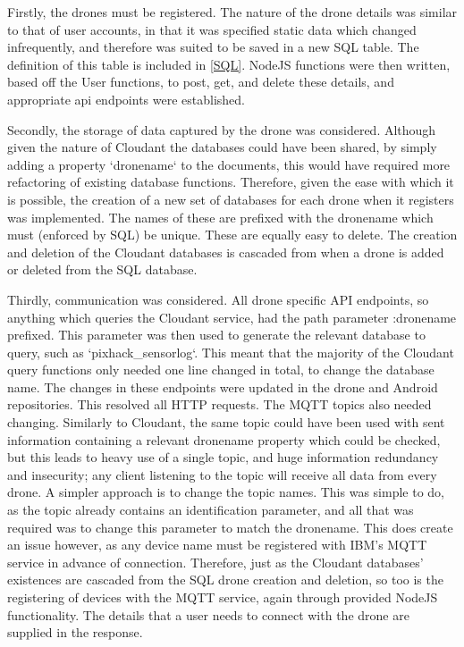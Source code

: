 \documentclass{article}
\begin{document}
Firstly, the drones must be registered. The nature of the drone details was similar to that of user accounts, in that it was specified static data which changed infrequently, and therefore was suited to be saved in a new SQL table. The definition of this table is included in \ref{SQL}. NodeJS functions were then written, based off the User functions, to post, get, and delete these details, and appropriate api endpoints were established. 

Secondly, the storage of data captured by the drone was considered. Although given the nature of Cloudant the databases could have been shared, by simply adding a property `dronename` to the documents, this would have required more refactoring of existing database functions. Therefore, given the ease with which it is possible, the creation of a new set of databases for each drone when it registers was implemented. The names of these are prefixed with the dronename which must (enforced by SQL) be unique. These are equally easy to delete. The creation and deletion of the Cloudant databases is cascaded from when a drone is added or deleted from the SQL database. 

Thirdly, communication was considered. All drone specific API endpoints, so anything which queries the Cloudant service, had the path parameter :dronename prefixed. This parameter was then used to generate the relevant database to query, such as `pixhack\_sensorlog`. This meant that the majority of the Cloudant query functions only needed one line changed in total, to change the database name. The changes in these endpoints were updated in the drone and Android repositories. This resolved all HTTP requests. The MQTT topics also needed changing. Similarly to Cloudant, the same topic could have been used with sent information containing a relevant dronename property which could be checked, but this leads to heavy use of a single topic, and huge information redundancy and insecurity; any client listening to the topic will receive all data from every drone. A simpler approach is to change the topic names. This was simple to do, as the topic already contains an identification parameter, and all that was required was to change this parameter to match the dronename. This does create an issue however, as any device name must be registered with IBM's MQTT service in advance of connection. Therefore, just as the Cloudant databases' existences are cascaded from the SQL drone creation and deletion, so too is the registering of devices with the MQTT service, again through provided NodeJS functionality. The details that a user needs to connect with the drone are supplied in the response.
\end{document}

